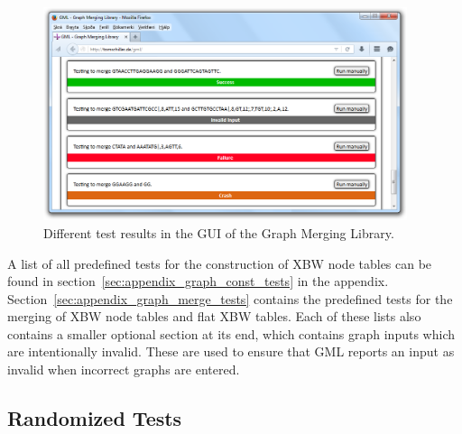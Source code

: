 \documentclass[a4paper,12pt,twoside,BCOR=10mm]{scrbook}
\begin{document}
\begin{figure}[!htb]
\centering
\includegraphics[width=0.95\textwidth]{evo_gml_different_test_results.png}
\caption[GML Test Results]{Different test results in the GUI of the Graph Merging Library.} \label{fig:evo_gml_different_test_results}
\end{figure}
A list of all predefined tests for the construction of XBW node tables can be found
in section~\ref{sec:appendix_graph_const_tests} in the appendix.
Section~\ref{sec:appendix_graph_merge_tests} contains the predefined tests for
the merging of XBW node tables and flat XBW tables.
Each of these lists also contains a smaller optional section at its end,
which contains graph inputs which are intentionally invalid. These are used
to ensure that GML reports an input as invalid when incorrect graphs are entered.

\subsection{Randomized Tests}
\end{document}
